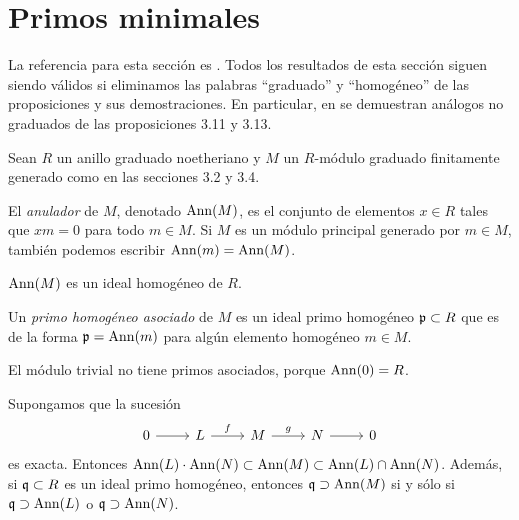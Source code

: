 \section{Primos minimales}

\noindent La referencia para esta sección es \cite[pp. 50-51]{hartshorne}. Todos los resultados de esta sección siguen siendo válidos si eliminamos las palabras ``graduado'' y ``homogéneo'' de las proposiciones y sus demostraciones. En particular, en \cite[pp. 91, 93]{eisenbud} se demuestran análogos no graduados de las proposiciones 3.11 y 3.13.

\begin{preliminaries}
Sean $R$ un anillo graduado noetheriano y $M$ un $R$-módulo graduado finitamente generado como en las secciones 3.2 y 3.4.
\end{preliminaries}

\begin{definition}
El \textit{anulador} de $M$, denotado $\operatorname{Ann}(M)$, es el conjunto de elementos $x \in R$ tales que $xm = 0$ para todo $m \in M$. Si $M$ es un módulo principal generado por $m \in M$, también podemos escribir $\operatorname{Ann}(m) = \operatorname{Ann}(M)$.
\end{definition}

\begin{remark}
$\operatorname{Ann}(M)$ es un ideal homogéneo de $R$.
\end{remark}

\begin{definition}
Un \textit{primo homogéneo asociado} de $M$ es un ideal primo homogéneo $\mathfrak p \subset R$ que es de la forma $\mathfrak p = \operatorname{Ann}(m)$ para algún elemento homogéneo $m \in M$.
\end{definition}

\begin{remark}
El módulo trivial no tiene primos asociados, porque $\operatorname{Ann}(0) = R$.
\end{remark}

\begin{proposition}
Supongamos que la sucesión
$$
\begin{tikzcd}
    0 \arrow[r] & L \arrow[r, "f"] & M \arrow[r, "g"] & N \arrow[r] & 0
\end{tikzcd}
$$
es exacta. Entonces $\operatorname{Ann}(L) \cdot \operatorname{Ann}(N) \subset \operatorname{Ann}(M) \subset \operatorname{Ann}(L) \cap \operatorname{Ann}(N)$. Además, si $\mathfrak q \subset R$ es un ideal primo homogéneo, entonces $\mathfrak q \supset \operatorname{Ann}(M)$ si y sólo si $\mathfrak q \supset \operatorname{Ann}(L)$ o $\mathfrak q \supset \operatorname{Ann}(N)$.
\end{proposition}

